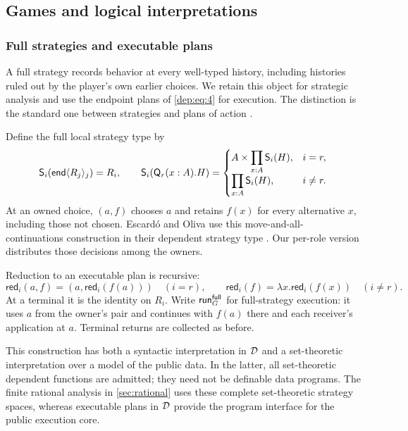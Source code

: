 \subsection{Games and logical interpretations}
\label{sec:interpretations}

\subsubsection{Full strategies and executable plans}
\label{sec:policies}

A full strategy records behavior at every well-typed history, including
histories ruled out by the player's own earlier choices. We retain this
object for strategic analysis and use the endpoint plans of \eqref{dep:eq:4} for
execution. The distinction is the standard one between strategies and
plans of action \cite{Rubinstein1991}.

Define the full local strategy type by
\[
 \mathsf S_i(\mathsf{end}\langle R_j\rangle_j)=R_i,\qquad
 \mathsf S_i(\mathsf Q_r(x:A).H)=
 \begin{cases}
 A\times\displaystyle\prod_{x:A}\mathsf S_i(H),&i=r,\\[3pt]
 \displaystyle\prod_{x:A}\mathsf S_i(H),&i\ne r.
 \end{cases}
\]
At an owned choice, $(a,f)$ chooses $a$ and retains $f(x)$ for every
alternative $x$, including those not chosen. Escard\'o and Oliva use this
move-and-all-continuations construction in their dependent strategy type
\cite[Definition~4.1]{EscardoOliva2023}. Our per-role version distributes
those decisions among the owners.

Reduction to an executable plan is recursive:
\[
 \mathsf{red}_i(a,f)
   =(a,\mathsf{red}_i(f(a)))\quad(i=r),\qquad
 \mathsf{red}_i(f)=\lambda x.\mathsf{red}_i(f(x))\quad(i\ne r).
\]
At a terminal it is the identity on $R_i$.
Write $\mathsf{run}_G^{\mathsf{full}}$ for full-strategy execution: it uses $a$
from the owner's pair and continues with
$f(a)$ there and each receiver's application at $a$. Terminal returns are
collected as before.

This construction has both a syntactic interpretation in $\mathcal D$ and a
set-theoretic interpretation over a model of the public data. In the latter,
all set-theoretic dependent functions are admitted; they need not be
definable data programs.
The finite rational analysis in \cref{sec:rational} uses these complete
set-theoretic strategy spaces, whereas executable plans in $\mathcal D$ provide
the program interface for the public execution core.

